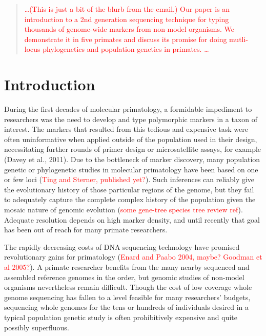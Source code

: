 \documentclass[12pt]{article}
\begin{document}
\maketitle

\begin{abstract}
\textcolor{red}{\ldots (This is just a bit of the blurb from the email.) Our paper is an introduction to a 2nd generation sequencing technique for typing thousands of genome-wide markers from non-model organisms.  We demonstrate it in five primates and discuss its promise for doing mutli-locus phylogenetics and population genetics in primates. \ldots}
\end{abstract}

\section{Introduction}

During the first decades of molecular primatology, a formidable impediment to researchers was the need to develop and type polymorphic markers in a taxon of interest. The markers that resulted from this tedious and expensive task were often uninformative when applied outside of the population used in their design, necessitating further rounds of primer design or microsatellite assays, for example (Davey et al., 2011). Due to the bottleneck of marker discovery, many population genetic or phylogenetic studies in molecular primatology have been based on one or few loci (\textcolor{red}{Ting and Sterner, published yet?}). Such inferences can reliably give the evolutionary history of those particular regions of the genome, but they fail to adequately capture the complete complex history of the population given the mosaic nature of genomic evolution (\textcolor{red}{some gene-tree species tree review ref}). Adequate resolution depends on high marker density, and until recently that goal has been out of reach for many primate researchers.

The rapidly decreasing costs of DNA sequencing technology have promised revolutionary gains for primatology (\textcolor{red}{Enard and Paabo 2004, maybe? Goodman et al 2005?}). A primate researcher benefits from the many nearby sequenced and assembled reference genomes in the order, but genomic studies of non-model organisms nevertheless remain difficult. Though the cost of low coverage whole genome sequencing has fallen to a level feasible for many researchers' budgets, sequencing whole genomes for the tens or hundreds of individuals desired in a typical population genetic study is often prohibitively expensive and quite possibly superfluous. 
\end{document}
